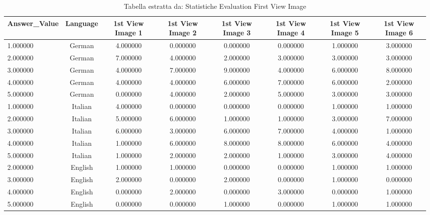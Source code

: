 \begin{table}[htbp]
\caption{Tabella estratta da: Statistiche Evaluation First View Image}
\label{tab:statistiche_evaluation first view image}
\begin{tabular}{lccccccc}
\toprule
Answer\_Value & Language & 1st View Image 1 & 1st View Image 2 & 1st View Image 3 & 1st View Image 4 & 1st View Image 5 & 1st View Image 6 \\
\midrule
1.000000 & German & 4.000000 & 0.000000 & 0.000000 & 0.000000 & 1.000000 & 3.000000 \\
2.000000 & German & 7.000000 & 4.000000 & 2.000000 & 3.000000 & 3.000000 & 3.000000 \\
3.000000 & German & 4.000000 & 7.000000 & 9.000000 & 4.000000 & 6.000000 & 8.000000 \\
4.000000 & German & 4.000000 & 4.000000 & 6.000000 & 7.000000 & 6.000000 & 2.000000 \\
5.000000 & German & 0.000000 & 4.000000 & 2.000000 & 5.000000 & 3.000000 & 3.000000 \\
1.000000 & Italian & 4.000000 & 0.000000 & 0.000000 & 0.000000 & 1.000000 & 1.000000 \\
2.000000 & Italian & 5.000000 & 6.000000 & 1.000000 & 1.000000 & 3.000000 & 7.000000 \\
3.000000 & Italian & 6.000000 & 3.000000 & 6.000000 & 7.000000 & 4.000000 & 1.000000 \\
4.000000 & Italian & 1.000000 & 6.000000 & 8.000000 & 8.000000 & 6.000000 & 4.000000 \\
5.000000 & Italian & 1.000000 & 2.000000 & 2.000000 & 1.000000 & 3.000000 & 4.000000 \\
2.000000 & English & 1.000000 & 1.000000 & 0.000000 & 0.000000 & 1.000000 & 1.000000 \\
3.000000 & English & 2.000000 & 0.000000 & 2.000000 & 0.000000 & 1.000000 & 0.000000 \\
4.000000 & English & 0.000000 & 2.000000 & 0.000000 & 3.000000 & 0.000000 & 1.000000 \\
5.000000 & English & 0.000000 & 0.000000 & 1.000000 & 0.000000 & 1.000000 & 1.000000 \\
\bottomrule
\end{tabular}
\end{table}
